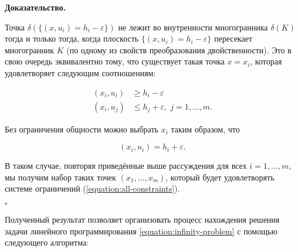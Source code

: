 \documentclass[a4paper, 10pt]{article}
\theoremstyle{definition}
\theoremstyle{plain}
\theoremstyle{plain}
\begin{document}
\textbf{Доказательство.}

Точка $\delta(\{(x, u_{i}) = h_{i} - \varepsilon\})$ не лежит во внутренности
многогранника $\delta(K)$ тогда и только тогда, когда плоскость
$\{(x, u_{i}) = h_{i} - \varepsilon\}$ пересекает многогранник $K$ (по
одному из свойств преобразования двойственности). Это в свою очередь
эквивалентно тому, что существует такая точка $x = x_{i}$, которая удовлетворяет
следующим соотношениям:

\begin{align*}
 (x_{i}, u_{i}) & \geq h_{i} - \varepsilon \\
 (x_{i}, u_{j}) & \leq h_{j} + \varepsilon, \; j = 1, \ldots, m.
\end{align*}

Без ограничения общности можно выбрать $x_{i}$ таким образом, что

\begin{equation*}
(x_{i}, u_{i}) = h_{i} + \varepsilon.
\end{equation*}

В таком случае, повторяя
приведённые выше рассуждения для всех $i = 1, \ldots, m$, мы получим набор
таких точек $(x_{1}, \ldots, x_{m})$, который будет удовлетворять системе
ограничений (\ref{equation:all-constraints}).

$\square$

Полученный результат позволяет организовать процесс нахождения решения задачи
линейного программирования \ref{equation:infinity-problem} с помощью
следующего алгоритма:
\end{document}
